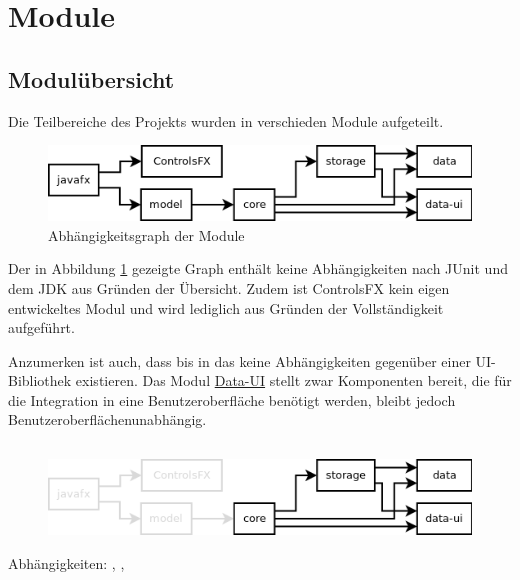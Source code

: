 
\newcommand{\depBox}[1]{
	\begin{adjustbox}{minipage=0.90\textwidth,margin=0 \smallskipamount,center}
		Abhängigkeiten:	 #1
	\end{adjustbox} ~\\
}

\section{Module}
\subsection{Modulübersicht}
Die Teilbereiche des Projekts wurden in verschieden Module aufgeteilt.

\begin{figure}[h!]
	\centering
	\includegraphics[width=.8\textwidth]{module_dependencies.png}
	\caption{Abhängigkeitsgraph der Module}
	\label{mod_dep_view}
\end{figure}

Der in Abbildung \ref{mod_dep_view} gezeigte Graph enthält keine Abhängigkeiten nach JUnit und
dem JDK aus Gründen der Übersicht. Zudem ist ControlsFX \cite{controlsfx} kein eigen
entwickeltes Modul und wird lediglich aus Gründen der Vollständigkeit aufgeführt.

Anzumerken ist auch, dass bis in das  keine Abhängigkeiten
gegenüber einer UI-Bibliothek existieren. Das Modul \hyperref[mod_data-ui]{Data-UI} stellt
zwar Komponenten bereit, die für die Integration in eine Benutzeroberfläche benötigt werden,
bleibt jedoch Benutzeroberflächenunabhängig.


\subsection{\textModCore}
\label{\textModCore}
\begin{figure}[h!]
	\centering
	\includegraphics[width=.8\textwidth]{module_dependencies_core.png}
\end{figure}
\depBox{, , \refLongP{\textModStorage}}

